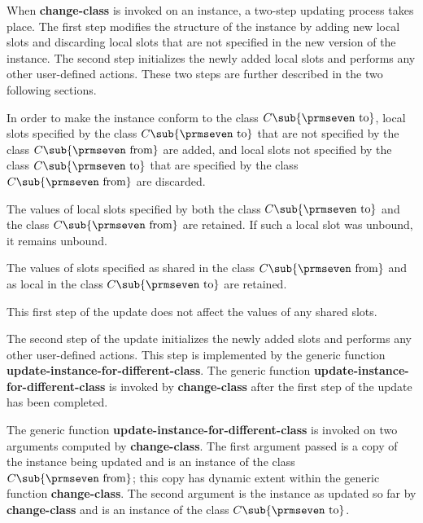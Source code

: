 When {\bf change-class} is invoked on an instance, a two-step updating
process takes place.  The first step modifies the structure of
the instance by adding new local slots and discarding local slots that
are not specified in the new version of the instance.  The second step
initializes the newly added local slots and performs any other
user-defined actions. These two steps are further described in the two
following sections.


In order to make the instance conform to the class $C\sub
{\hbox{{\prmseven to}}}$, local slots specified by the class $C\sub
{\hbox{{\prmseven to}}}$ that are not specified by the class $C\sub
{\hbox{{\prmseven from}}}$ are added, and local slots not specified by
the class $C\sub {\hbox{{\prmseven to}}}$ that are specified by the
class $C\sub {\hbox{{\prmseven from}}}$ are discarded.

The values of local slots specified by both the class $C\sub
{\hbox{{\prmseven to}}}$ and the class $C\sub {\hbox{{\prmseven
from}}}$ are retained. If such a local slot was unbound, it remains
unbound.

The values of slots specified as shared in the class $C\sub
{\hbox{{\prmseven from}}}$ and as local in the class $C\sub
{\hbox{{\prmseven to}}}$ are retained.

This first step of the update does not affect the values of any shared
slots.

\endsubSection%


The second step of the update initializes the newly added slots and
performs any other user-defined actions.  This step is implemented by
the generic function {\bf update-instance-for-different-class}.  The
generic function {\bf update-instance-for-different-class} is invoked
by {\bf change-class} after the first step of the update has been
completed.

The generic function {\bf update-instance-for-different-class} is
invoked on two arguments computed by {\bf change-class}.  The first
argument passed is a copy of the instance being updated and is an
instance of the class $C\sub {\hbox{{\prmseven from}}}$; this copy has
dynamic extent within the generic function {\bf change-class}.  The
second argument is the instance as updated so far by {\bf change-class}
and is an instance of the class $C\sub {\hbox{{\prmseven to}}}$.

